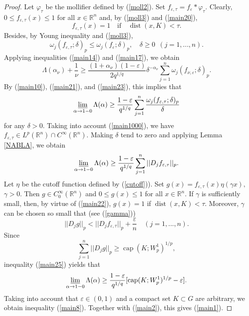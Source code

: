 \documentclass[12pt,twoside,reqno]{amsart}
\numberwithin{equation}{section}
\theoremstyle{definition}
\numberwithin{equation}{section}
\begin{document}
\begin{proof}
Let  ${\varphi}_\tau$ be the mollifier defined by (\ref{moll2}).
 Set
$f_{{\varepsilon},\tau}=f_{\varepsilon}\ast{\varphi}_\tau.$ Clearly, $0\le f_{{\varepsilon},\tau}(x)\le 1$ for all $x\in {\mathbb{R}}^n$ and, by (\ref{moll3}) and
(\ref{main20}),
\begin{equation}\label{main22}
f_{{\varepsilon},\tau}(x)=1 \quad\mbox{if}\quad {\operatorname{dist}}(x,K)<\tau.
\end{equation}
Besides, by Young inequality and (\ref{moll3}),
\begin{equation}\label{main23}
{\omega}_j(f_{{\varepsilon},\tau};{\delta})_p\le {\omega}_j(f_{\varepsilon};{\delta})_p, \quad{\delta}\ge 0\,\,\, (j=1,...,n).
\end{equation}
Applying inequalities (\ref{main14}) and (\ref{main17}), we obtain
$$
\Lambda({\alpha}_\nu)+\frac1{\nu}\ge \frac{(1+{\alpha}_\nu)(1-{\varepsilon})}{2q^{1/q}}{\delta}^{-{\alpha}_\nu}\sum_{j=1}^n{\omega}_j(f_{\nu,{\varepsilon}};{\delta})_p.
$$
By (\ref{main10}),
(\ref{main21}), and (\ref{main23}), this implies that
\begin{equation}\label{main24}
\varliminf_{{\alpha}\to 1-0}\Lambda({\alpha})\ge\frac{1-{\varepsilon}}{q^{1/q}}\sum_{j=1}^n\frac{{\omega}_j(f_{{\varepsilon},\tau};{\delta})_p}{\delta}
\end{equation}
for any ${\delta}>0.$ Taking into account (\ref{main1000}), we have  $f_{{\varepsilon},\tau}\in L^p({\mathbb{R}}^n)\cap C^\infty({\mathbb{R}}^n).$ Making ${\delta}$ tend to zero and applying Lemma \ref{NABLA}, we obtain
\begin{equation}\label{main25}
\varliminf_{{\alpha}\to 1-0}\Lambda({\alpha})\ge\frac{1-{\varepsilon}}{q^{1/q}}\sum_{j=1}^n||D_j f_{{\varepsilon},\tau}||_p.
\end{equation}
Let $\eta$ be the cutoff function defined by (\ref{cutoff})). Set $g(x)=f_{{\varepsilon},\tau}(x)\eta({\gamma } x),$ ${\gamma }>0.$ Then $g\in
C_0^\infty({\mathbb{R}}^n)$ and $0\le g(x)\le 1$ for all $x\in {\mathbb{R}}^n$. If $\gamma$ is sufficiently small, then, by virtue of (\ref{main22}),
$g(x)=1$ if ${\operatorname{dist}}(x,K) <\tau.$ Moreover, ${\gamma }$ can be chosen so small that (see (\ref{gamma}))
$$
||D_j g||_p<||D_j f_{{\varepsilon},\tau}||_p + \frac{\varepsilon}{n} \quad (j=1,...,n).
$$
Since
$$
\sum_{j=1}^n||D_j g||_p\ge {\operatorname{cap}}(K;W_p^1)^{1/p},
$$
 inequality (\ref{main25}) yields that
$$
\varliminf_{{\alpha}\to
1-0}\Lambda({\alpha})\ge\frac{1-{\varepsilon}}{q^{1/q}}[{\operatorname{cap}}(K;W_p^1)^{1/p}-{\varepsilon}].
$$
Taking into account that ${\varepsilon}\in (0,1)$ and a compact set $K\subset
G$ are arbitrary, we obtain inequality (\ref{main8}). Together with
(\ref{main2}), this gives (\ref{main1}).
\end{proof}
\end{document}
